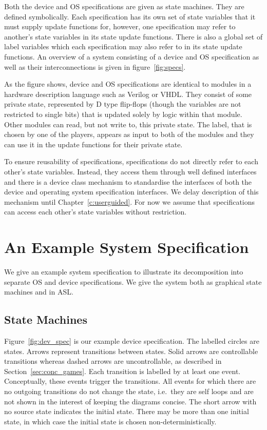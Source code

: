Both the device and OS specifications are given as state machines. They are defined symbolically. Each specification has its own set of state variables that it must supply update functions for, however, one specification may refer to another's state variables in its state update functions. There is also a global set of label variables which each specification may also refer to in its state update functions. An overview of a system consisting of a device and OS specification as well as their interconnections is given in figure~\ref{fig:specs}.

As the figure shows, device and OS specifications are identical to modules in a hardware description language such as Verilog or VHDL\@. They consist of some private state, represented by D type flip-flops (though the variables are not restricted to single bits) that is updated solely by logic within that module. Other modules can read, but not write to, this private state. The label, that is chosen by one of the players, appears as input to both of the modules and they can use it in the update functions for their private state.

To ensure reusability of specifications, specifications do not directly refer to each other's state variables. Instead, they access them through well defined interfaces and there is a device class mechanism to standardise the interfaces of both the device and operating system specification interfaces. We delay description of this mechanism until Chapter~\ref{c:userguided}. For now we assume that specifications can access each other's state variables without restriction.

\section{An Example System Specification}

We give an example system specification to illustrate its decomposition into separate OS and device specifications. We give the system both as graphical state machines and in ASL.

\subsection{State Machines}

Figure~\ref{fig:dev_spec} is our example device specification. The labelled circles are states. Arrows represent transitions between states. Solid arrows are controllable transitions whereas dashed arrows are uncontrollable, as described in Section~\ref{sec:conc_games}. Each transition is labelled by at least one event. Conceptually, these events trigger the transitions. All events for which there are no outgoing transitions do not change the state, i.e.\ they are self loops and are not shown in the interest of keeping the diagrams concise. The short arrow with no source state indicates the initial state. There may be more than one initial state, in which case the initial state is chosen non-deterministically.

